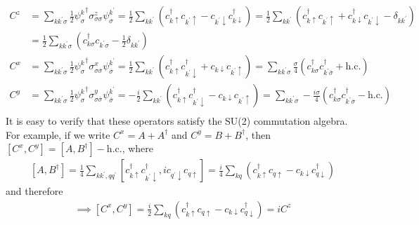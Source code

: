\documentclass[twoside]{report}
\numberwithin{equation}{section}
\begin{document}
\begin{equation}\begin{aligned}
	C^z 
	&= \sum_{kk^\prime\sigma}\frac{1}{2} {\psi^k_\sigma}^\dagger \sigma^z_{\sigma\sigma} \psi^{k^\prime}_\sigma = \frac{1}{2}\sum_{kk^\prime}\left(c^\dagger_{k\uparrow}c_{k^\prime \uparrow} - c_{k^\prime\downarrow}c^\dagger_{k \downarrow}\right) = \frac{1}{2}\sum_{kk^\prime}\left(c^\dagger_{k\uparrow}c_{k^\prime \uparrow} + c^\dagger_{k\downarrow}c_{k^\prime \downarrow} - \delta_{kk^\prime}\right)\\
	&= \frac{1}{2}\sum_{kk^\prime\sigma}\left(c^\dagger_{k\sigma}c_{k^\prime \sigma} - \frac{1}{2}\delta_{kk^\prime}\right)\label{diagonalCz}\\
	C^x 
	&= \sum_{kk^\prime\sigma}\frac{1}{2} {\psi^k_\sigma}^\dagger \sigma^x_{\sigma\overline\sigma} \psi^{k^\prime}_{\overline\sigma} = \frac{1}{2}\sum_{kk^\prime}\left( c^\dagger_{k\uparrow}c^\dagger_{k^\prime \downarrow} + c_{k\downarrow}c_{k^\prime \uparrow} \right) = \sum_{kk^\prime\sigma} \frac{\sigma}{4}\left( c^\dagger_{k\sigma}c^\dagger_{k^\prime\overline\sigma} + \text{h.c.} \right) \\
	C^y 
	&= \sum_{kk^\prime\sigma}\frac{1}{2} {\psi^k_\sigma}^\dagger \sigma^y_{\sigma\overline\sigma} \psi^{k^\prime}_{\overline\sigma} = - \frac{i}{2}\sum_{kk^\prime}\left( c^\dagger_{k\uparrow}c^\dagger_{k^\prime \downarrow} - c_{k\downarrow}c_{k^\prime \uparrow} \right) = \sum_{kk^\prime\sigma} - \frac{i\sigma}{4}\left( c^\dagger_{k\sigma}c^\dagger_{k^\prime\overline\sigma} - \text{h.c.} \right)\\
\end{aligned}\end{equation}
It is easy to verify that these operators satisfy the SU(2) commutation algebra. For example, if we write \(C^x = A + A^\dagger\) and \(C^y = B + B^\dagger\), then \(\left[ C^x, C^y \right] = \left[ A, B^\dagger \right] - \text{h.c.}\), where
\begin{equation}\begin{aligned}
	\left[ A, B^\dagger \right] = \frac{1}{4}\sum_{kk^\prime,qq^\prime}\left[ c^\dagger_{k\uparrow}c^\dagger_{k^\prime \downarrow}, i c_{q^\prime \downarrow}c_{q \uparrow} \right] = \frac{i}{4}\sum_{kq}\left(c^\dagger_{k\uparrow}c_{q \uparrow} - c_{k \downarrow}c^\dagger_{q \downarrow}\right)
\end{aligned}\end{equation}
and therefore
\begin{equation}\begin{aligned}
	\implies \left[ C^x, C^y \right] = \frac{i}{2}\sum_{kq}\left(c^\dagger_{k\uparrow}c_{q \uparrow} - c_{k \downarrow}c^\dagger_{q \downarrow}\right) = i C^z
\end{aligned}\end{equation}
\end{document}

